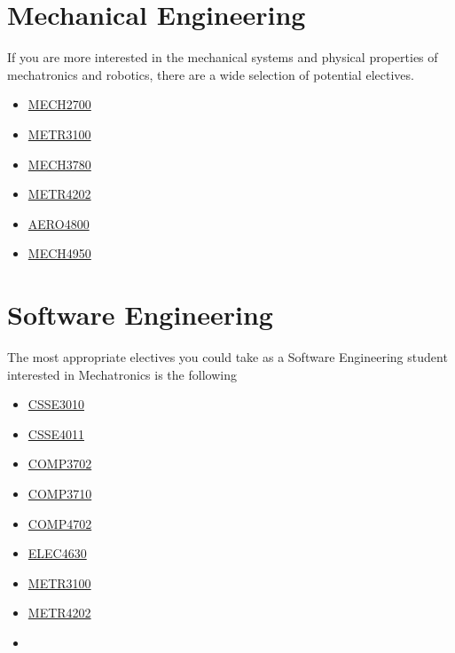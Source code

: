 \documentclass[a4paper,12pt]{report}
\begin{document}
\section{Mechanical Engineering}
If you are more interested in the mechanical systems and physical properties of mechatronics and robotics, there are a wide selection of potential electives.
\begin{multicols}{3}
    \begin{itemize}
        \item \hyperlink{MECH2700}{MECH2700}
        \item \hyperlink{METR3100}{METR3100}
        \item \hyperlink{MECH3780}{MECH3780}
        \item \hyperlink{METR4202}{METR4202}
        \item \hyperlink{AERO4800}{AERO4800}
        \item \hyperlink{MECH4950}{MECH4950}
    \end{itemize}
\end{multicols}

\section{Software Engineering}
The most appropriate electives you could take as a Software Engineering student interested in Mechatronics is the following
\begin{multicols}{3}
    \begin{itemize}
        \item \hyperlink{CSSE3010}{CSSE3010}
        \item \hyperlink{CCSE4011}{CSSE4011}
        \item \hyperlink{COMP3702}{COMP3702}
        \item \hyperlink{COMP3710}{COMP3710}
        \item \hyperlink{COMP4702}{COMP4702}
        \item \hyperlink{ELEC4630}{ELEC4630}
        \item \hyperlink{METR3100}{METR3100}
        \item \hyperlink{METR4202}{METR4202}
        \item[]
    \end{itemize}
\end{multicols}
\end{document}

